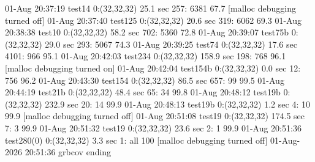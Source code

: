 01-Aug 20:37:19 test14      0:(32,32,32)    25.1 sec  257:  6381 67.7%
[malloc debugging turned off]
01-Aug 20:37:40 test125     0:(32,32,32)    20.6 sec  319:  6062 69.3%
01-Aug 20:38:38 test10      0:(32,32,32)    58.2 sec  702:  5360 72.8%
01-Aug 20:39:07 test75b     0:(32,32,32)    29.0 sec  293:  5067 74.3%
01-Aug 20:39:25 test74      0:(32,32,32)    17.6 sec 4101:   966 95.1%
01-Aug 20:42:03 test234     0:(32,32,32)   158.9 sec  198:   768 96.1%
[malloc debugging turned on]
01-Aug 20:42:04 test154b    0:(32,32,32)     0.0 sec   12:   756 96.2%
01-Aug 20:43:30 test154     0:(32,32,32)    86.5 sec  657:    99 99.5%
01-Aug 20:44:19 test21b     0:(32,32,32)    48.4 sec   65:    34 99.8%
01-Aug 20:48:12 test19b     0:(32,32,32)   232.9 sec   20:    14 99.9%
01-Aug 20:48:13 test19b     0:(32,32,32)     1.2 sec    4:    10 99.9%
[malloc debugging turned off]
01-Aug 20:51:08 test19      0:(32,32,32)   174.5 sec    7:     3 99.9%
01-Aug 20:51:32 test19      0:(32,32,32)    23.6 sec    2:     1 99.9%
01-Aug 20:51:36 test280(0)  0:(32,32,32)     3.3 sec    1:   all  100%
[malloc debugging turned off]
01-Aug-2026 20:51:36 grbcov ending
